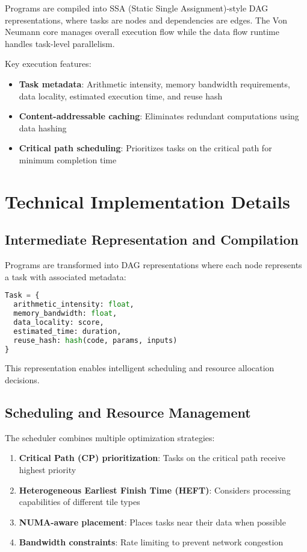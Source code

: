 \documentclass[11pt,a4paper]{article}
\begin{document}
Programs are compiled into SSA (Static Single Assignment)-style DAG representations, where tasks are nodes and dependencies are edges. The Von Neumann core manages overall execution flow while the data flow runtime handles task-level parallelism.

Key execution features:
\begin{itemize}
\item \textbf{Task metadata}: Arithmetic intensity, memory bandwidth requirements, data locality, estimated execution time, and reuse hash
\item \textbf{Content-addressable caching}: Eliminates redundant computations using data hashing
\item \textbf{Critical path scheduling}: Prioritizes tasks on the critical path for minimum completion time
\end{itemize}

\section{Technical Implementation Details}
\label{sec:implementation}

\subsection{Intermediate Representation and Compilation}

Programs are transformed into DAG representations where each node represents a task with associated metadata:

\begin{lstlisting}[language=Python, caption=Task metadata structure]
Task = {
  arithmetic_intensity: float,
  memory_bandwidth: float,
  data_locality: score,
  estimated_time: duration,
  reuse_hash: hash(code, params, inputs)
}
\end{lstlisting}

This representation enables intelligent scheduling and resource allocation decisions.

\subsection{Scheduling and Resource Management}

The scheduler combines multiple optimization strategies:

\begin{enumerate}
\item \textbf{Critical Path (CP) prioritization}: Tasks on the critical path receive highest priority
\item \textbf{Heterogeneous Earliest Finish Time (HEFT)}: Considers processing capabilities of different tile types
\item \textbf{NUMA-aware placement}: Places tasks near their data when possible
\item \textbf{Bandwidth constraints}: Rate limiting to prevent network congestion
\end{enumerate}
\end{document}
